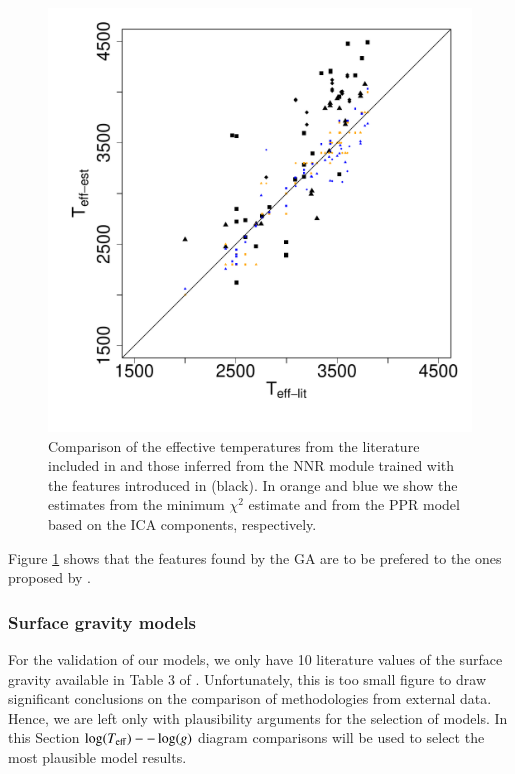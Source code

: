 \begin {figure}
 \centering
  \includegraphics[scale=0.45]{figs/irtf-CESteffs-literature.pdf}
  
  \caption{Comparison of the effective temperatures from the
  literature included in \protect\cite{cesetti} and those inferred from the
  NNR module trained with the features introduced in \protect\cite{cesetti}
  (black). In orange and blue we show the estimates from the minimum
  $\chi^2$ estimate and from the PPR model based on the ICA
  components, respectively.}

\label{fig:irtf-cesteff}
\end {figure}

Figure \ref{fig:irtf-cesteff} shows that the features found by the GA
are to be prefered to the ones proposed by \cite{cesetti}. 

\subsubsection{Surface gravity models}

For the validation of our models, we only have 10 literature values of
the surface gravity available in Table 3 of
\cite{cesetti}. Unfortunately, this is too small figure to draw
significant conclusions on the comparison of methodologies from
external data. Hence, we are left only with plausibility arguments for
the selection of models. In this Section $\log(T_{\rm
eff})--\log(g)$ diagram comparisons will be used to select the most 
plausible model results. 

